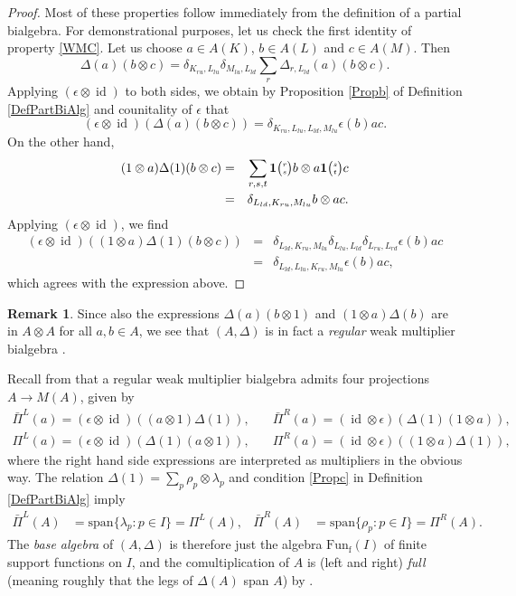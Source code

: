 \documentclass[11pt]{article}
\DeclareMathOperator{\fin}{\mathrm{f}}
\DeclareMathOperator{\id}{id}
\newcommand{\Fun}{\mathrm{Fun}}
\newcommand{\Grt}[3]{#1{\tiny {\begin{pmatrix} #2\\#3\end{pmatrix}}}}
\newcommand{\UnitC}[2]{\Grt{\mathbf{1}}{#1}{#2}}
\theoremstyle{definition}
\newtheorem{Rem}[Theorem]{Remark}
\numberwithin{equation}{section}
\begin{document}
\begin{proof} Most of these properties follow immediately from the definition of a partial bialgebra. For demonstrational purposes, let us check the first identity of property \ref{WMC}. Let us choose $a\in A(K)$, $b\in A(L)$ and $c\in A(M)$. Then \[\Delta(a)(b\otimes c) = \delta_{K_{ru},L_{lu}}\delta_{M_{lu},L_{ld}} \sum_r \Delta_{r,L_{ld}}(a)(b\otimes c).\]  Applying $(\epsilon\otimes \id)$ to both sides, we obtain by Proposition \ref{Propb} of Definition \ref{DefPartBiAlg} and counitality of $\epsilon$ that \[(\epsilon \otimes \id)(\Delta(a)(b\otimes c)) = \delta_{K_{ru},L_{lu},L_{ld},M_{lu}} \epsilon(b) ac.\] On the other hand, \begin{eqnarray*} (1\otimes a)\Delta(1)(b\otimes c) &=& \sum_{r,s,t} \UnitC{r}{s} b \otimes a\UnitC{s}{t}c \\ &=& \delta_{L_{ld},K_{ru},M_{lu}} b \otimes ac.\end{eqnarray*} Applying $(\epsilon\otimes \id)$, we find \begin{eqnarray*} (\epsilon\otimes \id)( (1\otimes a)\Delta(1)(b\otimes c) ) &=&  \delta_{L_{ld},K_{ru},M_{lu}}\delta_{L_{lu},L_{ld}}\delta_{L_{ru},L_{rd}} \epsilon(b)ac \\ &=&  \delta_{L_{ld},L_{lu},K_{ru},M_{lu}} \epsilon(b)ac,\end{eqnarray*} which agrees with the expression above.
\end{proof} 

\begin{Rem} 
Since also the expressions $\Delta(a)(b\otimes 1)$ and $(1\otimes a)\Delta(b)$ are in $A\otimes A$ for all $a,b\in A$, we see that $(A,\Delta)$ is in fact a \emph{regular} weak multiplier bialgebra \cite[Definition 2.3]{Boh1}.
\end{Rem} 

Recall from \cite[Section 3]{Boh1} that a regular weak multiplier
bialgebra admits four projections $A\rightarrow M(A)$, given
by \begin{align*} \bar{\Pi}^L(a) = (\epsilon\otimes \id)((a\otimes
  1)\Delta(1)),\quad & \bar{\Pi}^R(a) = (\id\otimes
  \epsilon)(\Delta(1)(1\otimes a)),\\ \Pi^L(a) = (\epsilon\otimes
  \id)(\Delta(1)(a\otimes 1)),\quad& \Pi^R(a) =
  (\id\otimes\epsilon)((1\otimes a)\Delta(1)),\end{align*} where the
right hand side expressions are interpreted as multipliers in the
obvious way. The relation  $\Delta(1)=\sum_{p} \rho_{p} \otimes \lambda_{p}$ and  condition \ref{Propc} in Definition \ref{DefPartBiAlg} imply
\begin{align*}
  \bar \Pi^{L}(A) &=\mathrm{span}\{\lambda_{p}:p\in I\} =  \Pi^{L}(A), &
  \bar \Pi^{R}(A) &= \mathrm{span}\{\rho_{p}:p\in I\} =\Pi^{R}(A).
\end{align*}
The \emph{base algebra} of $(A,\Delta)$ is therefore just the algebra
$\Fun_{\fin}(I)$ of finite support functions on $I$, and the
comultiplication of $A$ is (left and right) \emph{full} (meaning
roughly that the legs of $\Delta(A)$ span $A$) by \cite[Theorem 3.13]{Boh1}.  
\end{document}
